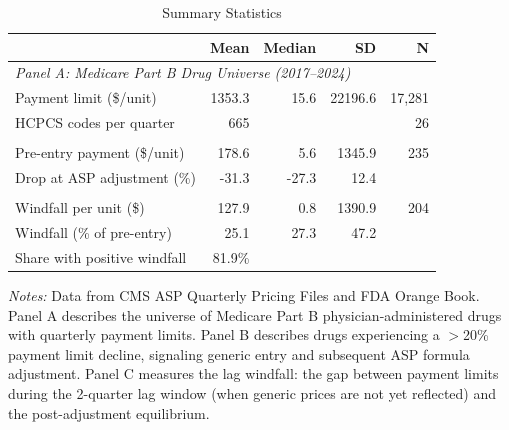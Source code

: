 \begin{table}[ht]
\centering
\begin{threeparttable}
\caption{Summary Statistics}
\label{tab:summary}
\begin{tabular}{lrrrr}
\toprule
 & Mean & Median & SD & N \\
\midrule
\multicolumn{5}{l}{\textit{Panel A: Medicare Part B Drug Universe (2017--2024)}} \\
Payment limit (\$/unit) & 1353.3 & 15.6 & 22196.6 & 17,281 \\
HCPCS codes per quarter & 665 & & & 26 \\
\addlinespace
\multicolumn{5}{l}{\textit{Panel B: Generic Entry Events}} \\
Pre-entry payment (\$/unit) & 178.6 & 5.6 & 1345.9 & 235 \\
Drop at ASP adjustment (\%) & -31.3 & -27.3 & 12.4 & \\
\addlinespace
\multicolumn{5}{l}{\textit{Panel C: Lag Windfall}} \\
Windfall per unit (\$) & 127.9 & 0.8 & 1390.9 & 204 \\
Windfall (\% of pre-entry) & 25.1 & 27.3 & 47.2 & \\
Share with positive windfall & 81.9\% & & & \\
\bottomrule
\end{tabular}
\begin{tablenotes}[flushleft]\footnotesize
\item \textit{Notes:} Data from CMS ASP Quarterly Pricing Files and FDA Orange Book. Panel A describes the universe of Medicare Part B physician-administered drugs with quarterly payment limits. Panel B describes drugs experiencing a $>$20\% payment limit decline, signaling generic entry and subsequent ASP formula adjustment. Panel C measures the lag windfall: the gap between payment limits during the 2-quarter lag window (when generic prices are not yet reflected) and the post-adjustment equilibrium.
\end{tablenotes}
\end{threeparttable}
\end{table}

